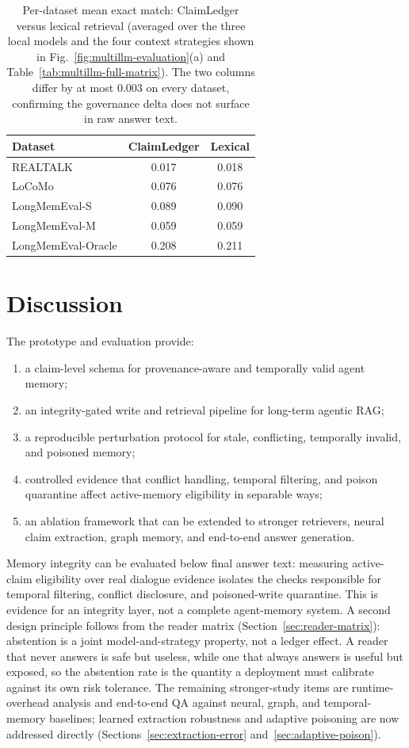 \begin{table}[!t]
\centering
\caption{Per-dataset mean exact match: ClaimLedger versus lexical retrieval (averaged over the three local models and the four context strategies shown in Fig.~\ref{fig:multillm-evaluation}(a) and Table~\ref{tab:multillm-full-matrix}). The two columns differ by at most 0.003 on every dataset, confirming the governance delta does not surface in raw answer text.}
\begin{tabular}{lcc}
\toprule
Dataset & ClaimLedger & Lexical \\
\midrule
REALTALK & 0.017 & 0.018 \\
LoCoMo & 0.076 & 0.076 \\
LongMemEval-S & 0.089 & 0.090 \\
LongMemEval-M & 0.059 & 0.059 \\
LongMemEval-Oracle & 0.208 & 0.211 \\
\bottomrule
\end{tabular}
\label{tab:multillm-summary}
\end{table}

\section{Discussion}\label{sec:discussion}

The prototype and evaluation provide:

\begin{enumerate}
\item a claim-level schema for provenance-aware and temporally valid agent memory;
\item an integrity-gated write and retrieval pipeline for long-term agentic RAG;
\item a reproducible perturbation protocol for stale, conflicting, temporally invalid, and poisoned memory;
\item controlled evidence that conflict handling, temporal filtering, and poison quarantine affect active-memory eligibility in separable ways;
\item an ablation framework that can be extended to stronger retrievers, neural claim extraction, graph memory, and end-to-end answer generation.
\end{enumerate}

Memory integrity can be evaluated below final answer text: measuring active-claim eligibility over real dialogue evidence isolates the checks responsible for temporal filtering, conflict disclosure, and poisoned-write quarantine. This is evidence for an integrity layer, not a complete agent-memory system. A second design principle follows from the reader matrix (Section~\ref{sec:reader-matrix}): abstention is a joint model-and-strategy property, not a ledger effect. A reader that never answers is safe but useless, while one that always answers is useful but exposed, so the abstention rate is the quantity a deployment must calibrate against its own risk tolerance. The remaining stronger-study items are runtime-overhead analysis and end-to-end QA against neural, graph, and temporal-memory baselines; learned extraction robustness and adaptive poisoning are now addressed directly (Sections~\ref{sec:extraction-error} and~\ref{sec:adaptive-poison}).

